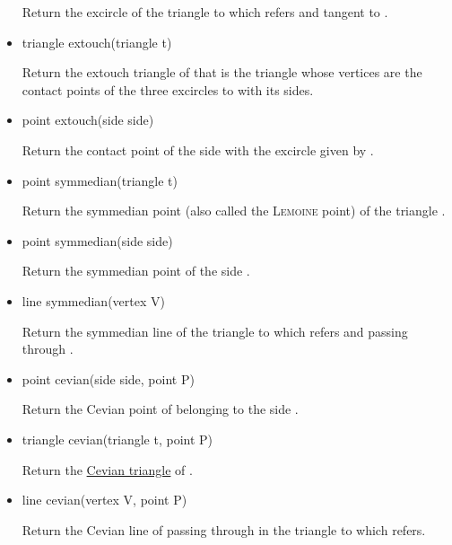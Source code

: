 \documentclass[pdftex]{article}
\begin{document}
\begin{itemize}
  Return the excircle of the triangle to
  which  refers and tangent to .
\item {}
  \begin{Vcolor}
    triangle extouch(triangle t)
  \end{Vcolor}
  Return the extouch triangle of  that is the triangle
  whose vertices are the contact points of the three excircles
  to  with its sides.
\item {}
  \begin{Vcolor}
    point extouch(side side)
  \end{Vcolor}
  Return the contact point of the side  with the excircle
  given by  .
\item {}
  \begin{Vcolor}
    point symmedian(triangle t)
  \end{Vcolor}
  Return the symmedian point (also called the \textsc{Lemoine} point) of the
  triangle .
\item {}
  \begin{Vcolor}
    point symmedian(side side)
  \end{Vcolor}
  Return the symmedian point of the side .
\item {}
  \begin{Vcolor}
    line symmedian(vertex V)
  \end{Vcolor}
  Return the symmedian line of the triangle to which  refers
  and passing through .
\item {}
  \begin{Vcolor}
    point cevian(side side, point P)
  \end{Vcolor}
  Return the {\sc Cevian} point of  belonging to the side .
\item {}
  \begin{Vcolor}
    triangle cevian(triangle t, point P)
  \end{Vcolor}
  Return the
  \href{http://mathworld.wolfram.com/CevianTriangle.html}{{\sc Cevian}
    triangle} of .
\item {}
  \begin{Vcolor}
    line cevian(vertex V, point P)
  \end{Vcolor}
  Return the {\sc Cevian} line of  passing
  through  in the triangle to which  refers.


\end{itemize}
\end{document}
